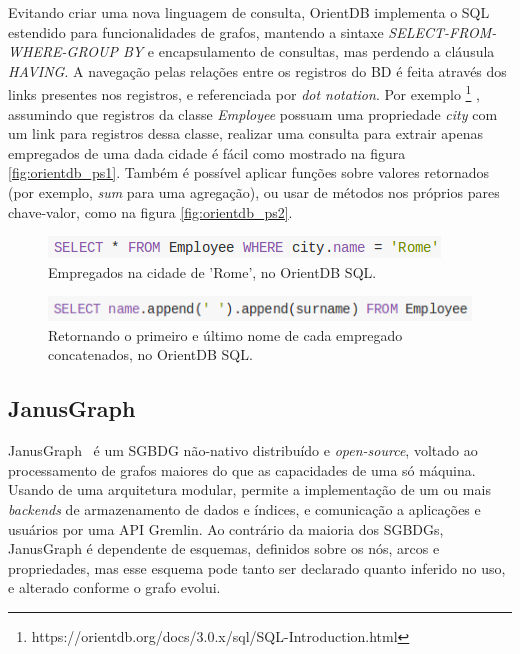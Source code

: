 \documentclass[conference]{IEEEtran}
\begin{document}
Evitando criar uma nova linguagem de consulta, OrientDB implementa o SQL
estendido para funcionalidades de grafos, mantendo a sintaxe
\emph{SELECT-FROM-WHERE-GROUP BY} e encapsulamento de consultas, mas perdendo
a cláusula \emph{HAVING}. A navegação pelas relações entre os registros do BD
é feita através dos links presentes nos registros, e referenciada por
\emph{dot notation}. Por exemplo
\footnote{https://orientdb.org/docs/3.0.x/sql/SQL-Introduction.html}
, assumindo que registros da classe
\emph{Employee} possuam uma propriedade \emph{city} com um link para registros
dessa classe, realizar uma consulta para extrair apenas empregados de uma
dada cidade é fácil como mostrado na figura \ref{fig:orientdb_ps1}. Também é
possível aplicar funções sobre valores retornados (por exemplo, \emph{sum}
para uma agregação), ou usar de métodos nos próprios pares chave-valor, como
na figura \ref{fig:orientdb_ps2}.

\begin{figure}[htbp]
\centerline{\includegraphics[width=0.9\linewidth]{orientdb/orientdb_ps1.png}}
\caption{Empregados na cidade de 'Rome', no OrientDB SQL.}\label{
  fig:orientdb_ps1}
\label{fig}
\end{figure}

\begin{figure}[htbp]
\centerline{\includegraphics[width=0.9\linewidth]{orientdb/orientdb_ps2.png}}
\caption{Retornando o primeiro e último nome de cada empregado concatenados,
  no OrientDB SQL.}\label{fig:orientdb_ps2}
\label{fig}
\end{figure}

\subsection{JanusGraph}

JanusGraph~\cite{janusgraph} é um SGBDG não-nativo distribuído e
\emph{open-source}, voltado ao processamento de grafos maiores do que as
capacidades de uma só máquina. Usando de uma arquitetura modular, permite a
implementação de um ou mais \emph{backends} de armazenamento de dados e
índices, e comunicação a aplicações e usuários por uma API Gremlin. Ao
contrário da maioria dos SGBDGs, JanusGraph é dependente de esquemas,
definidos sobre os nós, arcos e propriedades, mas esse esquema pode tanto
ser declarado quanto inferido no uso, e alterado conforme o grafo evolui.
\end{document}
